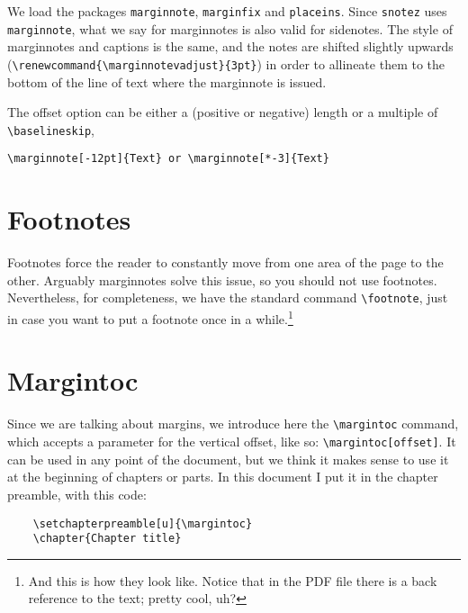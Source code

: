 We load the packages \verb|marginnote|, \verb|marginfix| and 
\verb|placeins|. Since \verb|snotez| uses \verb|marginnote|, what we say 
for marginnotes is also valid for sidenotes. The style of marginnotes 
and captions is the same, and the notes are shifted slightly upwards 
(\verb|\renewcommand{\marginnotevadjust}{3pt}|) in order to allineate 
them to the bottom of the line of text where the marginnote is issued.

The offset option can be either a (positive or negative) length or a 
multiple of \verb|\baselineskip|, \eg
\begin{verbatim}
\marginnote[-12pt]{Text} or \marginnote[*-3]{Text}
\end{verbatim}

\section{Footnotes}

Footnotes force the reader to constantly move from one area of the page 
to the other. Arguably marginnotes solve this issue, so you should not 
use footnotes. Nevertheless, for completeness, we have the standard 
command \verb|\footnote|, just in case you want to put a footnote once 
in a while.\footnote{And this is how they look like. Notice that in the 
PDF file there is a back reference to the text; pretty cool, uh?}

\section{Margintoc}

Since we are talking about margins, we introduce here the 
\verb|\margintoc| command, which accepts a parameter for the vertical 
offset, like so: \verb|\margintoc[offset]|. It can be used in any point 
of the document, but we think it makes sense to use it at the beginning 
of chapters or parts. In this document I put it in the chapter preamble, 
with this code:


\begin{verbatim}
	\setchapterpreamble[u]{\margintoc}
	\chapter{Chapter title}
\end{verbatim}

